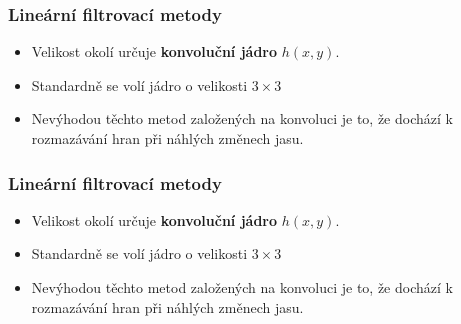 \documentclass[FM]{tulpresentation}
\begin{document}
	\begin{frame}
		\frametitle{Lineární filtrovací metody}
		\begin{itemize}
			\item Velikost okolí určuje \textbf{konvoluční jádro} $h(x, y)$.
			\item Standardně se volí jádro o velikosti $3\times3$
			\item Nevýhodou těchto metod založených na 			konvoluci je to, že dochází k rozmazávání hran při náhlých změnech jasu.
		\end{itemize}
	\end{frame}
	
	\begin{frame}
		\frametitle{Lineární filtrovací metody}
		\begin{itemize}
			\item Velikost okolí určuje \textbf{konvoluční jádro} $h(x, y)$.
			\item Standardně se volí jádro o velikosti $3\times3$
			\item Nevýhodou těchto metod založených na 			konvoluci je to, že dochází k rozmazávání hran při náhlých změnech jasu.
		\end{itemize}
	\end{frame}
  \TULendframe
\end{document}
